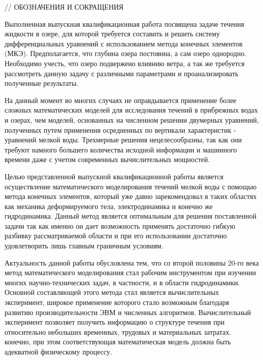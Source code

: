 \documentclass[14pt]{extreport}
\begin{document}
%

\newcommand\scalemath[2]{\scalebox{#1}{\mbox{\ensuremath{\displaystyle #2}}}}



\tableofcontents
\intro

// ОБОЗНАЧЕНИЯ И СОКРАЩЕНИЯ

Выполненная выпускная квалификационная работа посвящена задаче течения жидкости в озере, для которой требуется составить и решить систему дифференциальных уравнений с использованием метода конечных элементов (МКЭ). Предполагается, что глубина озера постоянна, а сам озеро однородно. Необходимо учесть, что озеро подвержено влиянию ветра, а так же требуется рассмотреть данную задачу с различными параметрами и проанализировать полученные результаты.

На данный момент во многих случаях не оправдывается применение более сложных математических моделей для исследования течений в прибрежных водах и озерах, чем моделей, основанных на численном решении двумерных уравнений, полученных путем применения осредненных по вертикали характеристик - уравнений мелкой воды. Трехмерные решения нецелесообразны, так как они требуют намного большего количества исходной информации и машинного времени даже с учетом современных вычислительных мощностей.

Целью представленной выпускной квалификационной работы является осуществление математического моделирования течений мелкой воды с помощью метода конечных элементов, который уже давно зарекомендовал в таких областях как механика деформируемого тела, электродинамика и конечно же гидродинамика. Данный метод является оптимальным для решения поставленной задачи так как именно он дает возможность применять достаточно гибкую разбивку рассматриваемой области и при его использовании достаточно удовлетворить лишь главным граничным условиям.

Актуальность данной работы обусловлена тем, что со второй половины 20-го века метод математического моделирования стал рабочим инструментом при изучении многих научно-технических задач, в частности, и в области гидродинамики. Основной составляющей этого метода стал является вычислительных эксперимент, широкое применение которого стало возможным благодаря развитию производительности ЭВМ и численных алгоритмов. Вычислительный эксперимент позволяет получить информацию о структуре течения при относительно небольших временных, трудовых и материальных затратах. конечно, при этом соответствующая математическая модель должна быть адекватной физическому процессу.
\end{document}
